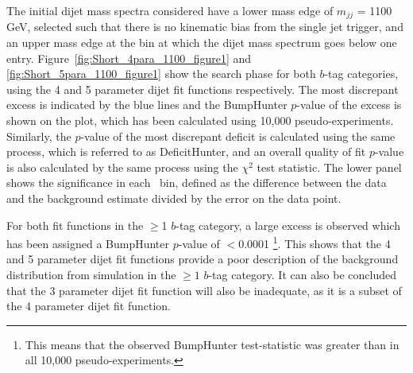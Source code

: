 The initial dijet mass spectra considered have a lower mass edge of $m_{jj}$ = 1100 GeV,
selected such that there is no kinematic bias from the single jet trigger,
and an upper mass edge at the \mjj{} bin at which the dijet mass spectrum goes below one entry.
Figure~\ref{fig:Short_4para_1100_figure1} and \ref{fig:Short_5para_1100_figure1} show the search phase
for both $b$-tag categories, using the 4 and 5 parameter dijet fit functions respectively.
The most discrepant excess is indicated by the blue lines and the BumpHunter \mbox{$p$-value} of the excess is shown on the plot,
which has been calculated using 10,000 pseudo-experiments.
Similarly, the \mbox{$p$-value} of the most discrepant deficit is calculated using the same process, which is referred to as DeficitHunter,
and an overall quality of fit \mbox{$p$-value} is also calculated by the same process using the $\chi^{2}$ test statistic.
The lower panel shows the significance in each~\mjj{} bin,
defined as the difference between the data and the background estimate divided by the error on the data point.

For both fit functions in the $\geq$1 $b$-tag category,
a large excess is observed which has been assigned a BumpHunter \mbox{$p$-value} of $<$0.0001
\footnote{This means that the observed BumpHunter test-statistic was greater than in all 10,000 pseudo-experiments.}.
This shows that the 4 and 5 parameter dijet fit functions provide a poor description
of the background distribution from simulation in the $\geq1$ $b$-tag category.
It can also be concluded that the 3 parameter dijet fit function will also be inadequate, as it is a subset of the 4 parameter dijet fit function.

